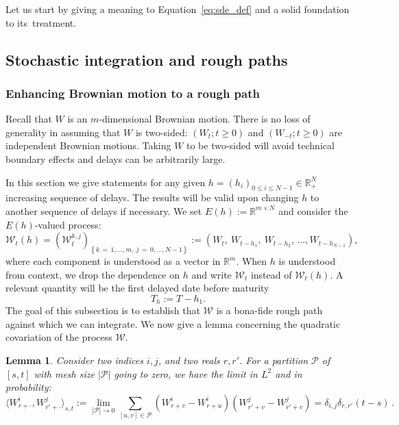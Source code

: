 \documentclass[11pt]{article}
\newtheorem{lemm}[theo]{Lemma}
\theoremstyle{definition}
\numberwithin{equation}{section}
\numberwithin{figure}{section}
\numberwithin{table}{section}
\newcommand*\R{\mathbb{R}}
\newcommand*\Pc{\mathcal{P}}
\newcommand*\Wc{\mathcal{W}}
\begin{document}
Let us start by giving a meaning to Equation~\eqref{eq:sde_def} and a solid foundation to its~treatment.

\subsection{Stochastic integration and rough paths}\label{subsection:rough_paths}

\subsubsection{Enhancing Brownian motion to a rough path}
Recall that $W$ is an $m$-dimensional Brownian motion. There is no loss of generality in assuming that $W$ is two-sided: $\left(W_t; t\geq 0 \right)$ and $\left(W_{-t};t \geq 0 \right)$ are independent Brownian motions. Taking $W$ to be two-sided will avoid technical boundary effects and delays can be arbitrarily large.

In this section we give statements for any given $h = \left(h_i \right)_{0 \leq i \leq N-1} \in \R_+^{N}$ increasing sequence of delays. The results will be valid upon changing $h$ to another sequence of delays if necessary. We set $E(h) := \R^{m \times N}$ and consider the $E(h)$-valued process:
\[
\Wc_t(h) = \left(\Wc_t^{k,j}\right)_{\left\{{k\,=\,1,\dots, m,\ j\,=\,0,\dots, N-1}\right\}}
:= \left(W_t, \ W_{t-h_1}, \ W_{t-h_2}, \, \dots, W_{t-h_{N-1}} \right),
\]
where each component is understood as a vector in $\R^m$. When $h$ is understood from context, we drop the dependence on $h$ and write $\Wc_t$ instead of $\Wc_t(h)$. A relevant quantity will be the first delayed date before maturity
\begin{equation}\label{def-th}
T_{h}:= T-{h_1}.
\end{equation}
The goal of this subsection is to establish that $\Wc$ is a bona-fide rough path against which we can integrate. We now give a lemma concerning the quadratic covariation of the process $\Wc$.

\begin{lemm}\label{lemma:zero_cov}
Consider two indices $i,j$, and two reals $r,r'$. For a partition $\Pc$ of $[s,t]$ with mesh size $|\Pc|$ going to zero, we have the limit in $L^2$ and in probability:
\[
\langle W^i_{r+\cdot}, W^j_{r'+\cdot} \rangle_{s,t}
:= \lim_{|\Pc| \rightarrow 0} \sum_{[u,v] \in \Pc} \left(W^i_{r+v} - W^i_{r+u} \right) \left(W^j_{r'+v} - W^j_{r'+v} \right)
= \delta_{i,j} \delta_{r,r'} (t-s)\,.
\]
\end{lemm}
\end{document}
